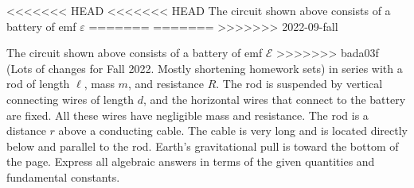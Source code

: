 \documentclass{../../oss-apphys-exam}
\newcounter{last}
\begin{document}
\begin{questions}
<<<<<<< HEAD
<<<<<<< HEAD
  \question The circuit shown above consists of a battery of emf $\varepsilon$
=======
=======
>>>>>>> 2022-09-fall
  \setcounter{question}{\value{last}}
  
  \question The circuit shown above consists of a battery of emf $\mathcal E$
>>>>>>> bada03f (Lots of changes for Fall 2022. Mostly shortening homework sets)
  in series with a rod of length $\ell$, mass $m$, and resistance $R$. The rod
  is suspended by vertical connecting wires of length $d$, and the horizontal
  wires that connect to the battery are fixed. All these wires have negligible
  mass and resistance. The rod is a distance $r$ above a conducting cable. The
  cable is very long and is located directly below and parallel to the rod.
  Earth's gravitational pull is toward the bottom of the page. Express all
  algebraic answers in terms of the given quantities and fundamental constants.
  \newpage


\end{questions}
\end{document}
